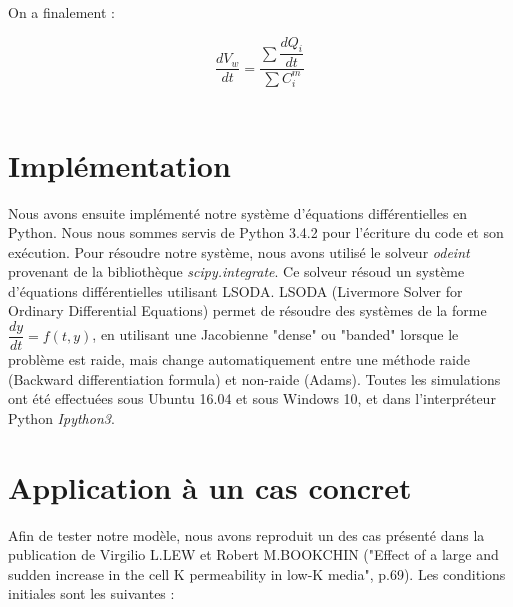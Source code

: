 \documentclass[a4paper,fleqn]{article}
\begin{document}
On a finalement :

\begin{equation*}
\dfrac{dV_w}{dt}=\dfrac{\sum \dfrac{dQ_i}{dt}}{\sum C_{i}^m}
\end{equation*}\\


\section{Implémentation}   

Nous avons ensuite implémenté notre système d'équations différentielles en Python. Nous nous sommes servis de Python 3.4.2 pour l'écriture du code et son exécution. Pour résoudre notre système, nous avons utilisé le solveur \textit{odeint} provenant de la bibliothèque \textit{scipy.integrate}. Ce solveur résoud un système d'équations différentielles utilisant LSODA. LSODA (Livermore Solver for Ordinary Differential Equations) permet de résoudre des systèmes de la forme $\dfrac{dy}{dt}=f\left(t,y\right)$, en utilisant une Jacobienne "dense" ou "banded" lorsque le problème est raide, mais change automatiquement entre une méthode raide (Backward differentiation formula) et non-raide (Adams).
Toutes les simulations ont été effectuées sous Ubuntu 16.04 et sous Windows 10, et dans l'interpréteur Python \textit{Ipython3}.
   



\section{Application à un cas concret}

Afin de tester notre modèle, nous avons reproduit un des cas présenté dans la publication de Virgilio L.LEW et Robert M.BOOKCHIN ("Effect of a large and sudden increase in the cell K permeability in low-K media", p.69). Les conditions initiales sont les suivantes :\\
\end{document}
